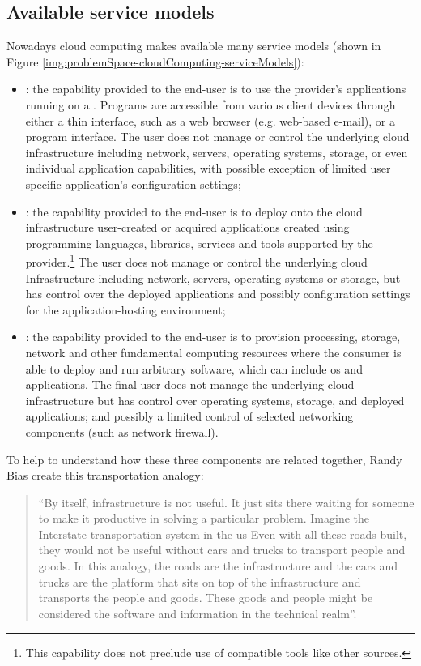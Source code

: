 \subsection*{Available service models}
\label{sec:problemSpace-cloudServiceModels}
Nowadays cloud computing makes available many service models (shown in Figure
\ref{img:problemSpace-cloudComputing-serviceModels}):

\begin{itemize}
	\item{: the capability provided to the end-user is to use the provider's
		applications running on a . Programs are accessible from various
		client devices through either a thin interface, such as a web browser (e.g. web-based e-mail),
		or a program interface. The user does not manage or control the underlying cloud infrastructure
		including network, servers, operating systems, storage, or even individual application capabilities,
		with possible exception of limited user specific application's configuration settings;}
	\item{: the capability provided to the end-user is to deploy onto the cloud
		infrastructure user-created or acquired applications created using programming languages,
		libraries, services and tools supported by the provider.\footnote{This capability does not preclude
		use of compatible tools like other sources.} The user does not manage or control the underlying
		cloud Infrastructure including network, servers, operating systems or storage, but has control
		over the deployed applications and possibly configuration settings for the application-hosting
		environment;}
	\item{: the capability provided to the end-user is to provision processing, storage,
		network and other fundamental computing resources where the consumer is able to deploy and run
		arbitrary software, which can include \acs{os} and applications. The final user does not
		manage the underlying cloud infrastructure but has control over operating systems, storage, and
		deployed applications; and possibly a limited control of selected networking components (such as
		network firewall).}
\end{itemize}

To help to understand how these three components are related together, Randy Bias \cite{differenceIaasPaas}
create this transportation analogy:

\begin{quote}
	``By itself, infrastructure is not useful. It just sits there waiting for someone to make it productive in
	solving a particular problem. Imagine the Interstate transportation system in the \acs{us} Even with all
	these roads built, they would not be useful without cars and trucks to transport people and goods. In this
	analogy, the roads are the infrastructure and the cars and trucks are the platform that sits on top of the
	infrastructure and transports the people and goods. These goods and people might be considered the software
	and information in the technical realm''.
\end{quote}

